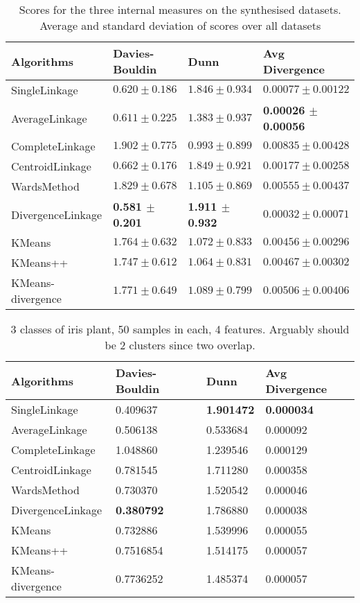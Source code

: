 
\begin{table}
\caption{Scores for the three internal measures on the synthesised datasets.  Average and standard deviation of scores over all datasets}\label{tab:avg_dim}
\begin{tabularx}{\textwidth}{Xl|l|l}
\hline      
Algorithms						&Davies-Bouldin  &Dunn		&Avg Divergence\\
\hline 
SingleLinkage         					&$0.620 \pm 0.186$&$1.846 \pm 0.934$&$0.00077 \pm 0.00122$\\      
AverageLinkage         					&$0.611 \pm 0.225$&$1.383 \pm 0.937$&\textbf{0.00026 $\pm$ 0.00056}\\        
CompleteLinkage      					&$1.902 \pm 0.775$&$0.993 \pm 0.899$&$0.00835 \pm 0.00428$\\        
CentroidLinkage        					&$0.662 \pm 0.176$&$1.849 \pm 0.921$&$0.00177 \pm 0.00258$\\       
WardsMethod          					&$1.829 \pm 0.678$&$1.105 \pm 0.869$&$0.00555 \pm 0.00437$\\      
DivergenceLinkage      			 	&\textbf{0.581 $\pm$ 0.201}&\textbf{1.911 $\pm$ 0.932}&$0.00032 \pm 0.00071$\\ 
KMeans							&$1.764 \pm 0.632$&$1.072 \pm 0.833$&$0.00456 \pm 0.00296$\\
KMeans++							&$1.747 \pm 0.612$&$1.064 \pm 0.831$&$0.00467 \pm 0.00302$\\
KMeans-divergence					&$1.771 \pm 0.649$&$1.089 \pm 0.799$&$0.00506 \pm 0.00406$\\
\hline
\end{tabularx}
\end{table}

\begin{table}
\caption{3 classes of iris plant, 50 samples in each, 4 features.  Arguably should be 2 clusters since two overlap.}\label{tab:iris}
\begin{tabularx}{\textwidth}{l@{\hskip 1in}XXl}
\hline
Algorithms			&Davies-Bouldin  	&Dunn			&Avg Divergence\\ 
\hline
SingleLinkage			&0.409637 		&\textbf{1.901472}	&\textbf{0.000034}\\       
AverageLinkage			&0.506138        		&0.533684			&0.000092\\       
CompleteLinkage		&1.048860        		&1.239546			&0.000129\\
CentroidLinkage		&0.781545        		&1.711280			&0.000358\\       
WardsMethod			&0.730370        		&1.520542			&0.000046\\       
DivergenceLinkage		&\textbf{0.380792}	&1.786880			&0.000038\\       
KMeans				&0.732886			&1.539996			&0.000055\\
KMeans++				&0.7516854		&1.514175			&0.000057\\
KMeans-divergence		&0.7736252		&1.485374			&0.000057\\   
\hline
\end{tabularx}
\end{table}


